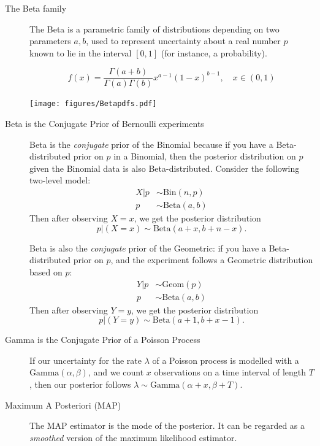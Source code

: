 \documentclass[10pt,landscape]{article}
\newcommand{\Bin}{\textrm{Bin}}
\newcommand{\Beta}{\textrm{Beta}}
\newcommand{\Gam}{\textrm{Gamma}}
\newcommand{\Geom}{\textrm{Geom}}
\begin{document}
\begin{multicols*}{3}
\begin{description}

\item [The Beta family]
The Beta is a parametric family of distributions depending on two parameters $a,b$, used to represent uncertainty about a real number $p$ known to lie in the interval $[0,1]$ (for instance, a probability).

$$f(x) = \frac{\Gamma(a+b)}{\Gamma(a)\Gamma(b)}x^{a-1}(1-x)^{b-1}, \quad x \in (0, 1) $$
\begin{minipage}{\linewidth}
            \centering
\texttt{[image: figures/Betapdfs.pdf]}
        \end{minipage}
\medskip

\item[Beta is the Conjugate Prior of Bernoulli experiments]

Beta is the \emph{conjugate} prior of the Binomial because if you have a Beta-distributed prior on $p$ in a Binomial, then the posterior distribution on $p$ given the Binomial data is also Beta-distributed. Consider the following two-level model:
    \begin{align*}
        X|p &\sim \Bin(n, p) \\
        p &\sim \Beta(a, b)
    \end{align*}
Then after observing  $X = x$, we get the posterior distribution
\[p|(X=x) \sim \Beta(a + x, b + n - x).\]

Beta is also the \emph{conjugate} prior of the Geometric: if you have a Beta-distributed prior on $p$, and the experiment follows a Geometric distribution based on $p$:
    \begin{align*}
        Y|p &\sim \Geom(p) \\
        p &\sim \Beta(a, b)
    \end{align*}
Then after observing  $Y = y$, we get the posterior distribution
\[p|(Y=y) \sim \Beta(a + 1, b + x - 1).\]

\item[Gamma is the Conjugate Prior of a Poisson Process]
If our uncertainty for the rate $\lambda$ of a Poisson process is modelled with a $\Gam(\alpha, \beta)$, and we count $x$ observations on a time interval of length $T$, then our posterior follows $\lambda\sim \Gam(\alpha + x, \beta + T)$.

\item[Maximum A Posteriori (MAP)]
The MAP estimator is the mode of the posterior.
It can be regarded as a \emph{smoothed} version of the maximum likelihood estimator.
\end{description}


\end{multicols*}
\end{document}
